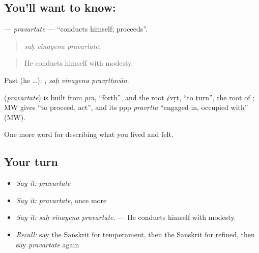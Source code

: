 \subsection*{You'll want to know: }
\textbf{} — \emph{pravartate} — \textquotedblleft{}conducts himself; proceeds\textquotedblright{}.

\begin{quote}
  
\end{quote}

\begin{quote}
\emph{saḥ vinayena pravartate.}
\end{quote}

\begin{quote}
He conducts himself with modesty.
\end{quote}

Past (he …):   , \emph{saḥ vinayena pravṛttavān}.

\begin{cousinweb}
\textbf{} (\emph{pravartate}) is built from \emph{pra}, \textquotedblleft{}forth\textquotedblright{}, and the root √vṛt, \textquotedblleft{}to turn\textquotedblright{}, the root of \textbf{}; MW gives \textquotedblleft{}to proceed, act\textquotedblright{}, and its ppp \emph{pravṛtta} \textquotedblleft{}engaged in, occupied with\textquotedblright{} (MW).
\end{cousinweb}

\begin{grammarlens}[title={What you've built}]
One more word for describing what you lived and felt.
\end{grammarlens}

\subsection*{Your turn}
\begin{itemize}
\raggedright
  \item \emph{Say it:} \emph{pravartate}
  \item \emph{Say it:} \emph{pravartate}, once more
  \item \emph{Say it:} \emph{saḥ vinayena pravartate.} — He conducts himself with modesty.
  \item \emph{Recall:} say the Sanskrit for temperament, then the Sanskrit for refined, then say \emph{pravartate} again
\end{itemize}

